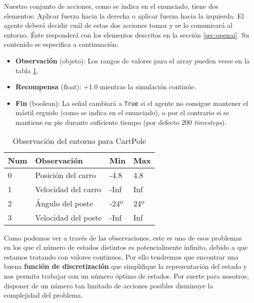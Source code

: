 Nuestro conjunto de acciones, como se indica en el enunciado, tiene dos elementos: Aplicar fuerza hacia la derecha o aplicar fuerza hacia la izquierda. El agente deberá decidir cuál de estas dos acciones tomar y se lo comunicará al entorno. Éste responderá con los elementos descritos en la sección \ref{sec:openai}. Su contenido se especifica a continuación:

\begin{itemize}
    \item \textbf{Observación} (objeto): Los rangos de valores para el array pueden verse en la tabla \ref{obs-cartpole}.
    \item \textbf{Recompensa} (float): +1.0 mientras la simulación continúe.
    \item \textbf{Fin} (boolean): La señal cambiará a \texttt{True} si el agente no consigue mantener el mástil erguido (como se indica en el enunciado), o por el contrario si se mantiene en pie durante suficiente tiempo (por defecto 200 \textit{timesteps}).
\end{itemize}
\begin{table}[]
    \centering
    \begin{tabular}{|l|l|l|l|}
    \hline
    \textbf{Num} & \textbf{Observación} & \textbf{Min} & \textbf{Max} \\ \hline
    0            & Posición del carro   & -4.8         & 4.8          \\ \hline
    1            & Velocidad del carro  & -Inf         & Inf          \\ \hline
    2            & Ángulo del poste     & -24º         & 24º          \\ \hline
    3            & Velocidad del poste  & -Inf         & Inf          \\ \hline
    \end{tabular}
    \caption{Observación del entorno para CartPole}
    \label{obs-cartpole}
\end{table}

Como podemos ver a través de las observaciones, este es uno de esos problemas en los que el número de estados distintos es potencialmente infinito, debido a que estamos tratando con valores continuos. Por ello tendremos que encontrar una buena \textbf{función de discretización} que simplifique la representación del estado y nos permita trabajar con un número óptimo de estados. Por suerte para nosotros, disponer de un número tan limitado de acciones posibles disminuye la complejidad del problema.


